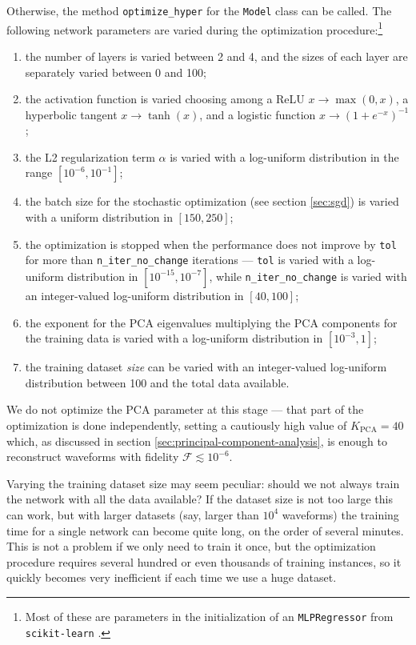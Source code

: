 \documentclass[main.tex]{subfiles}
\begin{document}
Otherwise, the method \texttt{optimize\_hyper} for the \texttt{Model} class can be called. 
The following network parameters are varied during the optimization procedure:\footnote{Most of these are parameters in the initialization of an \texttt{MLPRegressor} from \texttt{scikit-learn} \cite{pedregosaScikitlearnMachineLearning2011}.}
\begin{enumerate}
    \item the number of layers is varied between 2 and 4, and the sizes of each layer are separately varied between 0 and 100;
    \item the activation function is varied choosing among a \ac{ReLU} \(x \to \max(0, x)\), a hyperbolic tangent \(x 
\to \tanh(x)\), and a logistic function \(x \to (1 + e^{-x})^{-1}\);
    \item the L2 regularization term \(\alpha \) is varied with a log-uniform distribution in the range \([10^{-6}, 10^{-1}]\);
    \item the batch size for the stochastic optimization (see section \ref{sec:sgd}) is varied with a uniform distribution in \([150, 250]\);
    \item the optimization is stopped when the performance does not improve by \texttt{tol} for more than \texttt{n\_iter\_no\_change} iterations --- \texttt{tol} is varied with a log-uniform distribution in \([10^{-15}, 10^{-7}]\), while \texttt{n\_iter\_no\_change} is varied with an integer-valued log-uniform distribution in \([40, 100]\);
    \item the exponent for the \ac{PCA} eigenvalues multiplying the \ac{PCA} components for the training data is varied with a log-uniform distribution in \([10^{-3}, 1]\);
    \item the training dataset \emph{size} can be varied with an integer-valued log-uniform distribution between 100 and the total data available.
\end{enumerate}

We do not optimize the \ac{PCA} parameter at this stage --- that part of the optimization is done independently, setting a cautiously high value of \(K_{\text{PCA}} = 40\) which, as discussed in section \ref{sec:principal-component-analysis}, is  enough to reconstruct waveforms with fidelity \(\mathcal{F} \lesssim 10^{-6}\). 

Varying the training dataset size may seem peculiar: should we not always train the network with all the data available? 
If the dataset size is not too large this can work, but with larger datasets (say, larger than \(10^4\) waveforms) the training time for a single network can become quite long, on the order of several minutes. 
This is not a problem if we only need to train it once, but the optimization procedure requires several hundred or even thousands of training instances, so it quickly becomes very inefficient if each time we use a huge dataset. 
\end{document}
